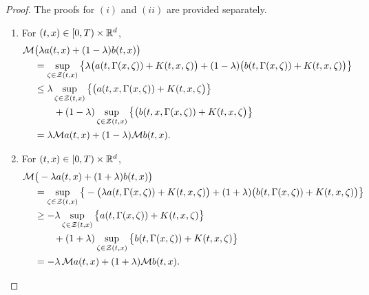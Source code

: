 \begin{proof}
    The proofs for $(i)$ and $(ii)$ are provided separately. 
    
    \begin{enumerate}[label=(\roman*)]
        \item For $(t,x) \in [0,T) \times \mathbb{R}^d$,
        \begin{align*}
            \mathcal{M} &\big(\lambda a(t,x) + (1-\lambda)b(t,x)\big) \\
            &= \sup_{\zeta \in \mathcal{Z}(t,x)} \big\{ \lambda \big(a(t,\Gamma(x,\zeta))+ K(t,x,\zeta)\big) + (1-\lambda) \big(b(t,\Gamma(x,\zeta)) + K(t,x,\zeta)\big) \big\} \\
            & \leq \lambda \sup_{\zeta \in \mathcal{Z}(t,x)} \big\{ \big( a(t,x,\Gamma(x,\zeta)) + K(t,x,\zeta \big) \big\} \\
            & \qquad + (1-\lambda) \sup_{\zeta \in \mathcal{Z}(t,x)} \big\{ \big( b(t,x,\Gamma(x,\zeta)) + K(t,x,\zeta \big) \big\} \\
            &= \lambda \mathcal{M} a(t,x) + (1-\lambda) \mathcal{M} b(t,x).
        \end{align*}

        \item For $(t,x) \in [0,T) \times \mathbb{R}^d$, 
        \begin{align*}
            \mathcal{M} & \big( - \lambda a(t,x) + (1+\lambda) b(t,x) \big) \\
            &= \sup_{\zeta \in \mathcal{Z}(t,x)} \big\{ -\big(\lambda a(t,\Gamma(x,\zeta)) +  K(t,x,\zeta)\big) + (1+\lambda) \big(b(t,\Gamma(x,\zeta)) + K(t,x,\zeta)\big) \big\} \\
            & \geq - \lambda \sup_{\zeta \in \mathcal{Z}(t,x)} \big\{ a(t,\Gamma(x,\zeta)) + K(t,x,\zeta) \big\}\\
            & \qquad + (1+\lambda) \sup_{\zeta \in \mathcal Z (t,x)} \big\{ b(t,\Gamma(x,\zeta)) + K(t,x,\zeta) \big\} \\
            & = - \lambda \, \mathcal{M} a(t,x) + (1+\lambda) \mathcal{M} b(t,x).
        \qedhere
        \end{align*}
    \end{enumerate}
\end{proof}
